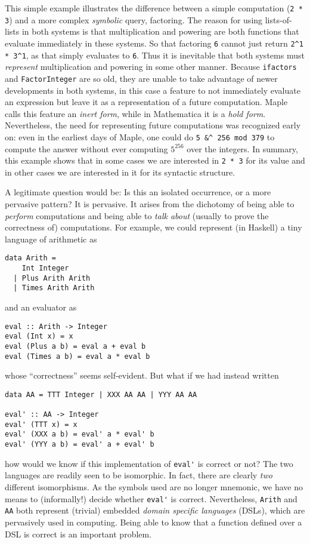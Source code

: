 \documentclass[fleqn]{llncs}
\begin{document}
This simple example illustrates the difference between a simple
computation (\texttt{2 * 3}) and a more complex \emph{symbolic} query,
factoring.  The reason for using lists-of-lists in both systems is
that multiplication and powering are both functions that evaluate
immediately in these systems.  So that factoring \texttt{6} cannot
just return \verb+2^1 * 3^1+, as that simply evaluates to \texttt{6}.
Thus it is inevitable that both systems must \emph{represent}
multiplication and powering in some other manner.  Because
\texttt{ifactors} and \texttt{FactorInteger} are so old, they are
unable to take advantage of newer developments in both systems,
in this case a feature to not immediately evaluate an expression
but leave it as a representation of a future computation.
Maple calls this feature
an \emph{inert form}, while in Mathematica it is a \emph{hold form}.
Nevertheless, the need for representing future computations was
recognized early on: even in
the earliest days of Maple, one could do \texttt{5 \&\textasciicircum
256 mod 379} to compute the answer without ever computing
$5^{256}$ over the integers.  In summary, this example shows that in
some cases we are interested in \texttt{2 * 3} for its value and in
other cases we are interested in it for its syntactic structure.

A legitimate question would be: Is this an isolated occurrence, or a
more pervasive pattern? It is pervasive. It arises from the dichotomy
of being able to \emph{perform} computations and being able to
\emph{talk about} (usually to prove the correctness of) computations.
For example, we could represent (in Haskell) a tiny language of
arithmetic as
\begin{lstlisting}
data Arith = 
    Int Integer 
  | Plus Arith Arith 
  | Times Arith Arith
\end{lstlisting}
\noindent and an evaluator as
\begin{lstlisting}
eval :: Arith -> Integer
eval (Int x) = x
eval (Plus a b) = eval a + eval b
eval (Times a b) = eval a * eval b
\end{lstlisting}
\noindent whose ``correctness'' seems self-evident.  But what if we had
instead written
\begin{lstlisting}
data AA = TTT Integer | XXX AA AA | YYY AA AA

eval' :: AA -> Integer
eval' (TTT x) = x
eval' (XXX a b) = eval' a * eval' b
eval' (YYY a b) = eval' a + eval' b
\end{lstlisting}
how would we know if this implementation of \lstinline|eval'| is
correct or not?  The two languages are readily seen to be isomorphic.
In fact, there are clearly \emph{two} different isomorphisms. As the
symbols used are no longer mnemonic, we have no means to (informally!)
decide whether \lstinline|eval'| is correct.  Nevertheless,
\lstinline|Arith| and \lstinline|AA| both represent (trivial) embedded
\emph{domain specific languages} (DSLs), which are pervasively used in
computing. Being able to know that a function defined over a DSL is
correct is an important problem.
\end{document}
